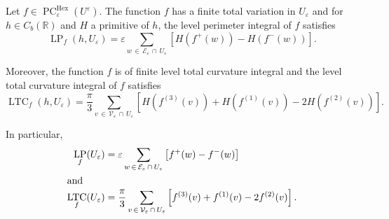 \documentclass[AHL,Unicode,longabstracts,published]{cedram}
\newcommand{\R}{\mathbb{R}}
\newcommand{\eps}{\varepsilon}
\DeclareMathOperator{\LTC}{LTC}
\DeclareMathOperator{\LP}{LP}
\DeclareMathOperator{\PC}{PC}
\DeclareMathOperator{\Hex}{Hex}
\newcommand{\calV}{\mathcal{V}}
\newcommand{\calE}{\mathcal{E}}
\begin{document}
\begin{prop}\label{level-int-discr:prop}
Let $f\in\PC^{\Hex}_\eps(U^{\eps})$. The function $f$ has a finite total variation in $U_\eps$ and for $h\in C_b(\R)$ and $H$ a primitive of $h$, the level perimeter integral of $f$ satisfies
\[
\LP_f\left(h,U_\eps\right)= \eps \sum_{w\,\in\,\calE_\eps\,\cap\,U_\eps} \left[H\left(f^+(w)\right) - H\left(f^-(w)\right)\right].
\]

Moreover, the function $f$ is of finite level total curvature integral and the level total curvature integral of $f$ satisfies
\[
\LTC_{f}(h,U_\eps)=\frac{\pi}{3}
\sum_{v\,\in\,\calV_\varepsilon\,\cap\,U_\eps} \left[H\left(f^{(3)}(v)\right) + H\left(f^{(1)}(v)\right)-2H\left(f^{(2)}(v)\right)\right].
\]

In particular,
\begin{align*}
\LP_f(U_\eps)&=\eps \sum_{w\,\in\,\calE_\eps\,\cap\,U_\eps} \left[f^+(w) -
f^-(w)\right]
\\
\intertext{and}
\LTC_{f}(U_\eps)&=\frac{\pi}{3}
\sum_{v\,\in\,{\calV}_\varepsilon\,\cap\,U_\eps} \left[f^{(3)}(v) +
f^{(1)}(v)-2f^{(2)}(v)\right].
\end{align*}
\end{prop}
\end{document}
